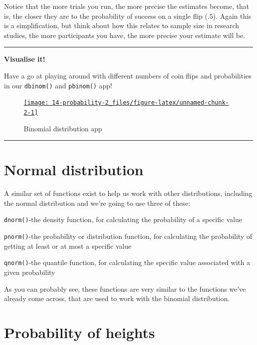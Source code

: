 \documentclass[
  oneside]{book}
\begin{document}
Notice that the more trials you run, the more precise the estimates become, that is, the closer they are to the probability of success on a single flip (.5). Again this is a simplification, but think about how this relates to sample size in research studies, the more participants you have, the more precise your estimate will be.

\begin{center}\rule{0.5\linewidth}{0.5pt}\end{center}

\textbf{Visualise it!}

Have a go at playing around with different numbers of coin flips and probabilities in our \texttt{dbinom()} and \texttt{pbinom()} app!

\begin{figure}

{\centering \href{https://shannon-mcnee19.shinyapps.io/binomial_shiny/}{\texttt{[image: 14-probability-2\_files/figure-latex/unnamed-chunk-2-1]} }

}

\caption{Binomial distribution app}\label{fig:unnamed-chunk-2}
\end{figure}

\begin{center}\rule{0.5\linewidth}{0.5pt}\end{center}

\hypertarget{normal-distribution}{%
\section{Normal distribution}\label{normal-distribution}}

A similar set of functions exist to help us work with other distributions, including the normal distribution and we're going to use three of these:

\texttt{dnorm()}-the density function, for calculating the probability of a specific value

\texttt{pnorm()}-the probability or distribution function, for calculating the probability of getting at least or at most a specific value

\texttt{qnorm()}-the quantile function, for calculating the specific value associated with a given probability

As you can probably see, these functions are very similar to the functions we've already come across, that are used to work with the binomial distribution.

\hypertarget{probability-of-heights}{%
\section{Probability of heights}\label{probability-of-heights}}
\end{document}

